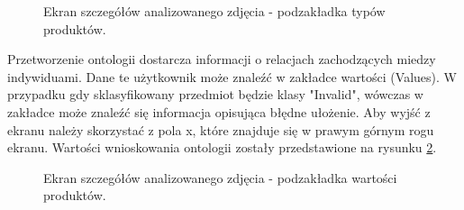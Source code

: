 {\begin{figure}[h]
	\caption{Ekran szczegółów analizowanego zdjęcia - podzakładka typów produktów.}
	\label{fig:typesView}	
\end{figure}
Przetworzenie ontologii dostarcza informacji o relacjach zachodzących miedzy indywiduami. Dane te użytkownik może znaleźć w zakładce wartości (Values). W przypadku gdy sklasyfikowany przedmiot będzie klasy "Invalid", wówczas w zakładce może znaleźć się informacja opisująca błędne ułożenie.  Aby wyjść z ekranu należy skorzystać z pola x, które znajduje się w prawym górnym rogu ekranu. Wartości wnioskowania ontologii zostały przedstawione na rysunku \ref{fig:details}.
\newpage
\begin{figure}[h]
	\centering
	\quad
	\caption{Ekran szczegółów analizowanego zdjęcia - podzakładka wartości produktów.}
	\label{fig:details}
\end{figure}
}

